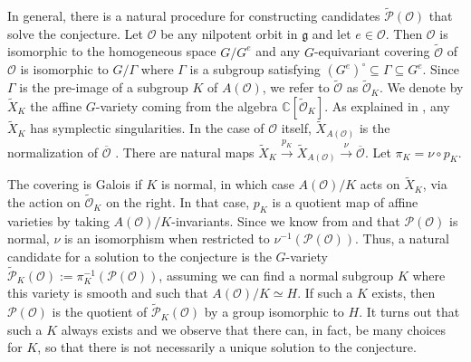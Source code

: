 \documentclass{amsart}
\theoremstyle{definition}
\newcommand{\C}{\mathbb{C}}
\newcommand{\cP}{\mathcal{P}}
\newcommand{\covP}{\widetilde{\mathcal{P}}}
\newcommand{\g}{\mathfrak{g}}
\newcommand{\0}{\mathcal{O}}
\begin{document}
In general, there is a natural procedure for constructing candidates $\covP(\0)$ that solve the conjecture.
Let $\0$ be any nilpotent orbit in $\g$ and let $e\in\0$.  
Then $\0$ is isomorphic to the homogeneous space $G/G^e$ 
and any $G$-equivariant covering $\widetilde{\0}$ of $\0$ is isomorphic to $G/\Gamma$ 
where $\Gamma$ is a subgroup satisfying 
$(G^e)^\circ \subseteq \Gamma \subseteq G^e$. %
Since $\Gamma$ is the pre-image of a subgroup $K$ of $A(\0)$, 
we refer to $\widetilde{\0}$ as $\widetilde{\0}_K$. 
We denote by $\widetilde{X}_K$ the affine $G$-variety coming from the algebra $\C[\widetilde{\0}_K]$.
As explained in \cite[\S P.3]{Namikawa:covers}, any $\widetilde{X}_K$ has symplectic singularities.
In the case of $\0$ itself, $\widetilde{X}_{A(\0)}$ is the normalization of $\overline{\0}$ \cite{Jantzen}.
There are natural maps $\widetilde{X}_K \xrightarrow{p_K} \widetilde{X}_{A(\0)} \xrightarrow{\nu} \overline{\0}$.
Let $\pi_K = \nu \circ p_K$.

The covering is Galois if $K$ is normal, in which case $A(\0)/K$
acts on $\widetilde{X}_K$, via the action on $\widetilde{\0}_K$ on the right.
In that case, $p_K$ is a quotient map of affine varieties by taking $A(\0)/K$-invariants. 
Since we know from 
\cite{FJLS23} and \cite{Kraft-Procesi:classical} that $\cP(\0)$ is normal, $\nu$ is an isomorphism 
when restricted to $\nu^{-1}(\cP(\0))$.  
Thus, a natural candidate for a solution to the conjecture is 
the $G$-variety $\covP_K(\0):= \pi_K^{-1}(\cP(\0))$,
assuming we can find a normal subgroup $K$ where this variety is smooth and such that 
$A(\0)/K \simeq H$.
If such a $K$ exists, then 
$\cP(\0)$ is the quotient of 
$\covP_K(\0)$ by a group isomorphic to $H$.
It turns out that such a $K$ always exists and we observe that there can, in fact, be many choices for $K$, so that there is not necessarily a unique solution to the conjecture.
\end{document}
